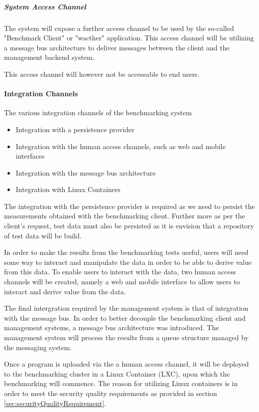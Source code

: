 \subparagraph{System Access Channel}
The system will expose a further access channel to be used by the so-called
"Benchmark Client" or "wacther" application. This access channel will be
utilizing a message bus architecture to deliver messages between the client
and the management backend system.

This access channel will however not be accessable to end users.

\paragraph{Integration Channels}
The various integration channels of the benchmarking system
\begin{itemize}
	\item Integration with a persistence provider
	\item Integration with the human access channels, such as web and
		mobile interfaces 
	\item Integration with the message bus architecture
	\item Integration with Linux Containers
\end{itemize}

The integration with the persistence provider is required as we need to persist
the measurements obtained with the benchmarking client. Further more as per the
client's request, test data must also be persisted as it is envision that a
repository of test data will be build.

In order to make the results from the benchmarking tests useful, users will
need some way to interact and manipulate the data in order to be able to
derive value from this data. To enable users to interact with the data,
two human access channels will be created, namely a web and mobile interface
to allow users to interact and derive value from the data.

The final intergration required by the management system is that of integration
with the message bus. In order to better decouple the benchmarking client and
management systems, a message bus architecture was introduced. The management
system will process the results from a queue structure managed by the messaging
system. 

Once a program is uploaded via the a human access channel, it will be deployed
to the benchmarking cluster in a Linux Container (LXC), upon which the
benchmarking will commence.  The reason for utilizing Linux containers is in
order to meet the security quality requirements as provided in
section \ref{sec:securityQualityRequirement}.

